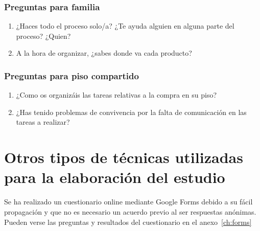 \subsubsection{Preguntas para familia}
\begin{enumerate}
    \item ¿Haces todo el proceso solo/a? ¿Te ayuda alguien en alguna parte del proceso? ¿Quien?
    \item A la hora de organizar, ¿sabes donde va cada producto?
\end{enumerate}

\subsubsection{Preguntas para piso compartido}
\begin{enumerate}
    \item ¿Como os organizáis las tareas relativas a la compra en su piso?
    \item ¿Has tenido problemas de convivencia por la falta de comunicación en las tareas a realizar?
\end{enumerate}

\section{Otros tipos de técnicas utilizadas para la elaboración del estudio}

Se ha realizado un cuestionario online mediante Google Forms debido a su fácil propagación y que no es necesario un acuerdo previo al ser respuestas anónimas. Pueden verse las preguntas y resultados del cuestionario en el anexo~\ref{ch:forms}